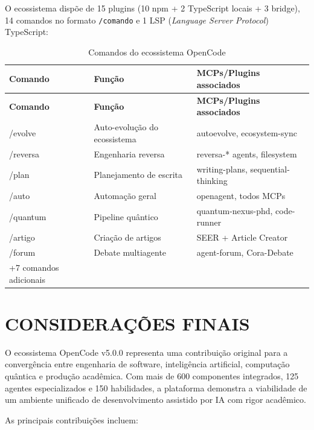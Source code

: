 \documentclass[
  brazil,
  sumario=tradicional,
  10pt
]{abntex2}
\begin{document}
O ecossistema dispõe de 15 plugins (10 npm + 2 TypeScript locais +
3 bridge), 14 comandos no formato \texttt{/comando} e 1 LSP
(\textit{Language Server Protocol}) TypeScript:

\begin{longtable}{p{3cm}p{4cm}p{5cm}}
  \caption{Comandos do ecossistema OpenCode}
  \label{tab:comandos}\\
  \toprule
  \textbf{Comando} & \textbf{Função} & \textbf{MCPs/Plugins associados} \\
  \midrule
  \endfirsthead
  \toprule
  \textbf{Comando} & \textbf{Função} & \textbf{MCPs/Plugins associados} \\
  \midrule
  \endhead
  \bottomrule
  \endfoot
  /evolve  & Auto-evolução do ecossistema & autoevolve, ecosystem-sync \\
  /reversa & Engenharia reversa           & reversa-* agents, filesystem \\
  /plan    & Planejamento de escrita      & writing-plans, sequential-thinking \\
  /auto    & Automação geral              & openagent, todos MCPs \\
  /quantum & Pipeline quântico            & quantum-nexus-phd, code-runner \\
  /artigo  & Criação de artigos            & SEER + Article Creator \\
  /forum   & Debate multiagente            & agent-forum, Cora-Debate \\
  +7 comandos adicionais \\
\end{longtable}

\section{CONSIDERAÇÕES FINAIS}
\label{sec:conclusao}

O ecossistema OpenCode v5.0.0 representa uma contribuição original
para a convergência entre engenharia de software, inteligência
artificial, computação quântica e produção acadêmica. Com mais de
600 componentes integrados, 125 agentes especializados e 150
habilidades, a plataforma demonstra a viabilidade de um ambiente
unificado de desenvolvimento assistido por IA com rigor acadêmico.

As principais contribuições incluem:
\end{document}
